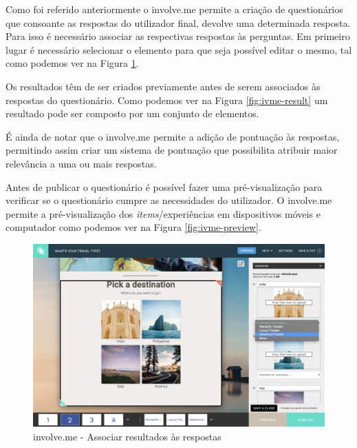 Como foi referido anteriormente o involve.me permite a criação de questionários que consoante as respostas do utilizador final, devolve uma determinada resposta. Para isso é necessário associar as respectivas respostas às perguntas. Em primeiro lugar é necessário selecionar o elemento para que seja possível editar o mesmo, tal como podemos ver na Figura \ref{fig:ivme-associar}.

Os resultados têm de ser criados previamente antes de serem associados às respostas do questionário. Como podemos ver na Figura \ref{fig:ivme-result} um resultado pode ser composto por um conjunto de elementos. 

É ainda de notar que o involve.me permite a adição de pontuação às respostas, permitindo assim criar um sistema de pontuação que possibilita atribuir maior relevância a uma ou mais respostas.

 Antes de publicar o questionário é possível fazer uma pré-visualização para verificar se o questionário cumpre as necessidades do utilizador. O involve.me permite a pré-visualização dos \textit{items}/experiências em dispositivos móveis e computador como podemos ver na Figura \ref{fig:ivme-preview}.
 
\newpage
\begin{figure}[ht!]
	\begin{center}
		\includegraphics[width=1\textwidth]{img/ivme/associar}
		\caption{involve.me - Associar resultados às respostas}
		\label{fig:ivme-associar}
	\end{center}
\end{figure}

